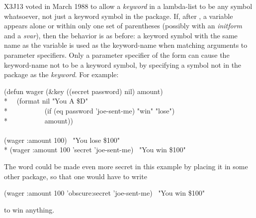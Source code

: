\begin{newer}
X3J13 voted in March 1988 
to allow a \textit{keyword} in a lambda-list
to be any symbol whatsoever, not just a keyword symbol
in the  package.  If, after ,
a variable appears alone or within only one set of parentheses
(possibly with an \textit{initform} and a \textit{svar}), then
the behavior is as before: a keyword symbol with the same name as
the variable is used as the keyword-name when matching arguments
to parameter specifiers.  Only a parameter specifier of the form
 can cause the keyword-name
not to be a keyword symbol, by specifying a symbol not in the 
package as the \textit{keyword}.
For example:
\begin{lisp}
(defun wager (\&key ((secret password) nil) amount) \\*
~~(format nil "You {\Xtilde}A \${\Xtilde}D" \\*
~~~~~~~~~~(if (eq password 'joe-sent-me) "win" "lose") \\*
~~~~~~~~~~amount)) \\
\\
(wager :amount 100) \EV\ "You lose \$100" \\*
(wager :amount 100 'secret 'joe-sent-me) \EV\ "You win \$100"
\end{lisp}
The  word could be made even more secret in this example
by placing it in some other  package, so that one would
have to write
\begin{lisp}
(wager :amount 100 'obscure:secret 'joe-sent-me) \EV\ "You win \$100"
\end{lisp}
to win anything.
\end{newer}

